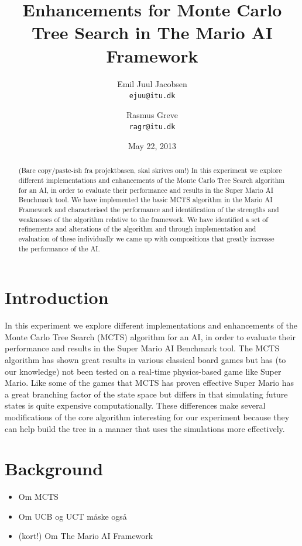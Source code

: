 \documentclass[10pt,a4paper]{article}
\begin{document}
\title{Enhancements for Monte Carlo Tree Search in The Mario AI Framework}
\date{May 22, 2013}
\author{Emil Juul Jacobsen\\\texttt{ejuu@itu.dk}        
        \and Rasmus Greve\\\texttt{ragr@itu.dk}}
\maketitle

\begin{abstract}
(Bare copy/paste-ish fra projektbasen, skal skrives om!)
In this experiment we explore different implementations and enhancements of the Monte Carlo Tree Search algorithm for an AI, in order to evaluate their performance and results in the Super Mario AI Benchmark tool. 
We have implemented the basic MCTS algorithm in the Mario AI 
Framework and characterised the performance and identification of 
the strengths and weaknesses of the algorithm relative to the 
framework. We have identified a set of refinements and alterations of the algorithm 
and through implementation and evaluation of these individually we came up
with compositions that greatly increase the performance of the AI.
\end{abstract}
\clearpage

\section{Introduction}
In this experiment we explore different implementations and enhancements of the Monte Carlo Tree Search (MCTS) algorithm for an AI, in order to evaluate their performance and results in the Super Mario AI Benchmark tool. The MCTS algorithm has shown great results in various classical board games but has (to our knowledge) not been tested on a real-time physics-based game like Super Mario. Like some of the games that MCTS has proven effective Super Mario has a great branching factor of the state space but differs in that simulating future states is quite expensive computationally. These differences make several modifications of the core algorithm interesting for our experiment because they can help build the tree in a manner that uses the simulations more effectively.

\section{Background}
\begin{itemize}
\item Om MCTS \cite{mctssurvey}
\item Om UCB og UCT \cite{mctssurvey} måske også \cite{mspacman}
\item (kort!) Om The Mario AI Framework  \cite{mario}
\end{itemize}
\end{document}
